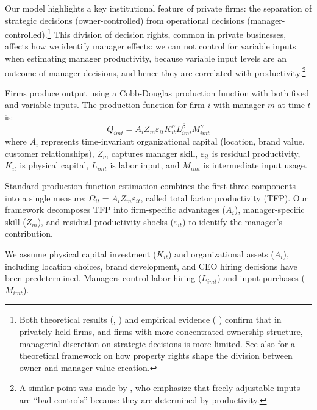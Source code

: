 \documentclass[11pt,a4paper]{article}
\begin{document}
Our model highlights a key institutional feature of private firms: the separation of strategic decisions (owner-controlled) from operational decisions (manager-controlled).\footnote{Both theoretical results (\citep{fama1983separation, jensen1976theory}, \citet{burkart2003family}) and empirical evidence (\citep{wang2019decentralization, buffington2017mops} \citet{bloom2012organization}) confirm that in privately held firms, and firms with more concentrated ownership structure, managerial discretion on strategic decisions is more limited. See also \citet{schulze2021property} for a theoretical framework on how property rights shape the division between owner and manager value creation.} This division of decision rights, common in private businesses, affects how we identify manager effects: we can not control for variable inputs when estimating manager productivity, because variable input levels are an outcome of manager decisions, and hence they are correlated with productivity.\footnote{A similar point was made by \citet{Gandhi2020-nu}, who emphasize that freely adjustable inputs are ``bad controls'' because they are determined by productivity.} 

Firms produce output using a Cobb-Douglas production function with both fixed and variable inputs. The production function for firm $i$ with manager $m$ at time $t$ is:
\begin{equation}\label{eq:production}
Q_{imt} = A_i Z_{m} \varepsilon_{it} K_{it}^\alpha L_{imt}^{\beta} M_{imt}^{\gamma}
\end{equation}
where $A_i$ represents time-invariant organizational capital (location, brand value, customer relationships), $Z_m$ captures manager skill, $\varepsilon_{it}$ is residual productivity, $K_{it}$ is physical capital, $L_{imt}$ is labor input, and $M_{imt}$ is intermediate input usage. 

Standard production function estimation combines the first three components into a single measure: $\Omega_{it} = A_i Z_m \varepsilon_{it}$, called total factor productivity (TFP). Our framework decomposes TFP into firm-specific advantages ($A_i$), manager-specific skill ($Z_m$), and residual productivity shocks ($\varepsilon_{it}$) to identify the manager's contribution.

We assume physical capital investment ($K_{it}$) and organizational assets ($A_i$), including location choices, brand development, and CEO hiring decisions have been predetermined. Managers control labor hiring ($L_{imt}$) and input purchases ($M_{imt}$). 
\end{document}
